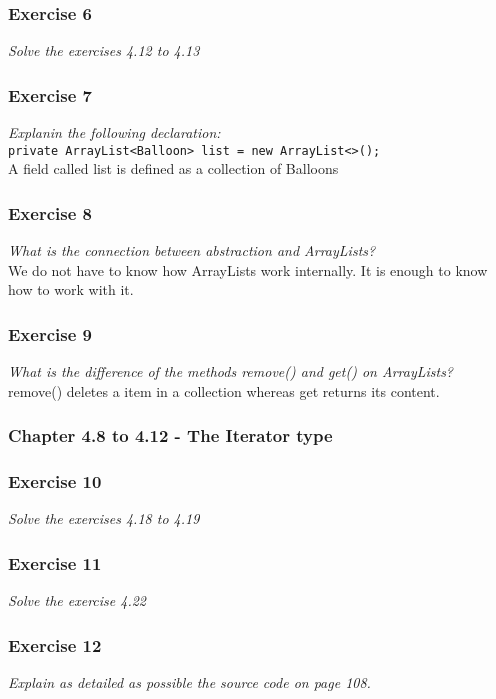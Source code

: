 \subsubsection*{Exercise 6}
\textit{Solve the exercises 4.12 to 4.13}\\

\subsubsection*{Exercise 7}
\textit{Explanin the following declaration:}\\
\lstinline?private ArrayList<Balloon> list = new ArrayList<>();?\\
A field called list is defined as a collection of Balloons

\subsubsection*{Exercise 8}
\textit{What is the connection between abstraction and ArrayLists?}\\
We do not have to know how ArrayLists work internally. It is enough to know 
how to work with it. 

\subsubsection*{Exercise 9}
\textit{What is the difference of the methods remove() and get() on
ArrayLists?}\\
remove() deletes a item in a collection whereas get returns its content. 

\subsubsection{Chapter 4.8 to 4.12 - The Iterator type}

\subsubsection*{Exercise 10}
\textit{Solve the exercises 4.18 to 4.19}\\

\subsubsection*{Exercise 11}
\textit{Solve the exercise 4.22}\\

\subsubsection*{Exercise 12}
\textit{Explain as detailed as possible the source code on page 108.}\\


